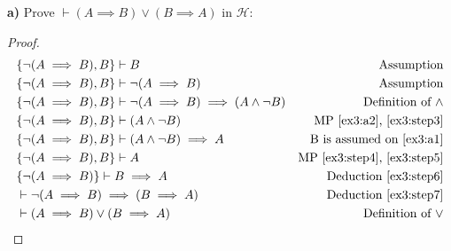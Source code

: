 \documentclass[titlepage, letterpaper, fleqn]{article}
\begin{document}
{\large \textbf{a)} Prove \(\vdash (A \implies B) \vee (B \implies A)\) in \(\mathscr{H}\):}

\begin{proof}
\begin{align}
& \{\neg (A \implies B), B \} \vdash B & \text{Assumption} \label{ex3:a1}
\\ & \{\neg (A \implies B), B \} \vdash \neg (A \implies B) & \text{Assumption} \label{ex3:a2}
\\ & \{\neg (A \implies B), B \} \vdash \neg(A \implies B) \implies (A \wedge \neg B) & \text{Definition of \(\wedge\)} \label{ex3:step3}
\\ & \{\neg (A \implies B), B \} \vdash (A \wedge \neg B) & \text{MP \ref{ex3:a2}, \ref{ex3:step3}} \label{ex3:step4}
\\ & \{\neg (A \implies B), B \} \vdash (A \wedge \neg B) \implies A & \text{B is assumed on \ref{ex3:a1}} \label{ex3:step5}
\\ & \{\neg (A \implies B), B \} \vdash A & \text{MP \ref{ex3:step4}, \ref{ex3:step5}} \label{ex3:step6}
\\ & \{\neg (A \implies B)\} \vdash B \implies A & \text{Deduction \ref{ex3:step6}} \label{ex3:step7}
\\ & \vdash \neg (A \implies B) \implies (B \implies A) & \text{Deduction \ref{ex3:step7}}
\\ & \vdash (A \implies B) \vee (B \implies A) & \text{Definition of \(\vee\)}
\end{align}
\end{proof}





\end{document}
